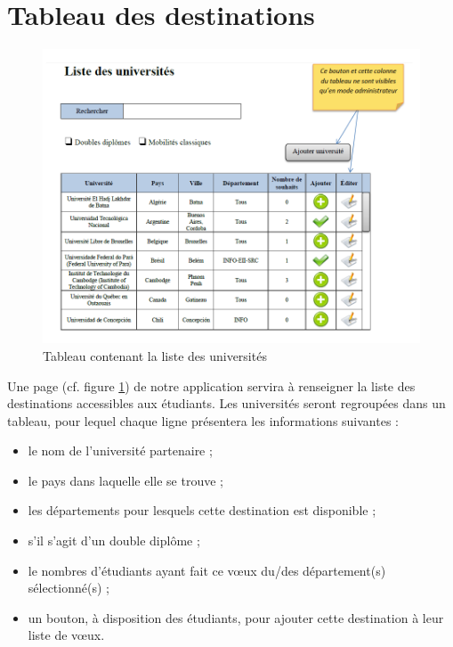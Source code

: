 \section{Tableau des destinations}
\label{sec::list_univ}

\begin{figure}[h!]
	\centering
	\includegraphics[scale=0.7]{Universites/listeUnivs.png}
	\caption{Tableau contenant la liste des universités}
	\label{fig::list_uni}
\end{figure}



Une page (cf. figure \ref{fig::list_uni}) de notre application servira à renseigner la liste des destinations accessibles aux étudiants.
Les universités seront regroupées dans un tableau, pour lequel chaque ligne présentera les informations suivantes :
 \begin{itemize}
 	\item le nom de l'université partenaire ;
 	\item le pays dans laquelle elle se trouve ;
 	\item les départements pour lesquels cette destination est disponible ;
 	\item s'il s'agit d'un double diplôme ;
 	\item le nombres d'étudiants ayant fait ce vœux du/des département(s) sélectionné(s) ;
 	\item un bouton, à disposition des étudiants, pour ajouter cette destination à leur liste de vœux.
 \end{itemize}
 
